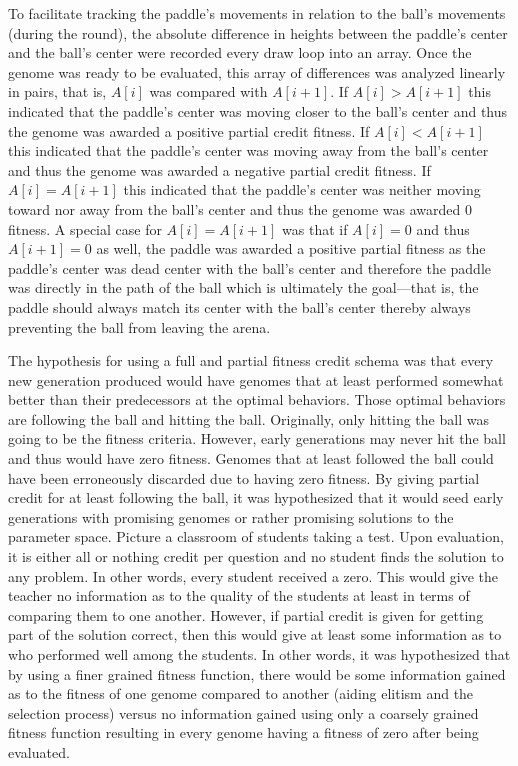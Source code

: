 \documentclass[a4paper,10pt]{article}
\begin{document}
To facilitate tracking the paddle's movements in relation to the ball's movements (during the round), the absolute difference in heights between the paddle's center and the ball's center were recorded every draw loop into an array. Once the genome was ready to be evaluated, this array of differences was analyzed linearly in pairs, that is, $A[i]$ was compared with $A[i+1]$. If $A[i]>A[i+1]$ this indicated that the paddle's center was moving closer to the ball's center and thus the genome was awarded a positive partial credit fitness. If $A[i]<A[i+1]$ this indicated that the paddle's center was moving away from the ball's center and thus the genome was awarded a negative partial credit fitness. If $A[i]=A[i+1]$ this indicated that the paddle's center was neither moving toward nor away from the ball's center and thus the genome was awarded $0$ fitness. A special case for $A[i]=A[i+1]$ was that if $A[i]=0$ and thus $A[i+1]=0$ as well, the paddle was awarded a positive partial fitness as the paddle's center was dead center with the ball's center and therefore the paddle was directly in the path of the ball which is ultimately the goal---that is, the paddle should always match its center with the ball's center thereby always preventing the ball from leaving the arena.

The hypothesis for using a full and partial fitness credit schema was that every new generation produced would have genomes that at least performed somewhat better than their predecessors at the optimal behaviors. Those optimal behaviors are following the ball and hitting the ball. Originally, only hitting the ball was going to be the fitness criteria. However, early generations may never hit the ball and thus would have zero fitness. Genomes that at least followed the ball could have been erroneously discarded due to having zero fitness. By giving partial credit for at least following the ball, it was hypothesized that it would seed early generations with promising genomes or rather promising solutions to the parameter space. Picture a classroom of students taking a test. Upon evaluation, it is either all or nothing credit per question and no student finds the solution to any problem. In other words, every student received a zero. This would give the teacher no information as to the quality of the students at least in terms of comparing them to one another. However, if partial credit is given for getting part of the solution correct, then this would give at least some information as to who performed well among the students. In other words, it was hypothesized that by using a finer grained fitness function, there would be some information gained as to the fitness of one genome compared to another (aiding elitism and the selection process) versus no information gained using only a coarsely grained fitness function resulting in every genome having a fitness of zero after being evaluated.
\end{document}
